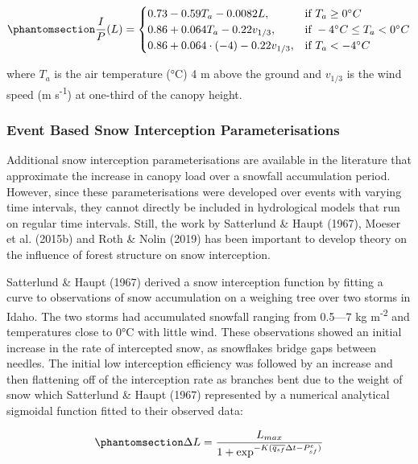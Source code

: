\documentclass[
  letterpaper,
]{tex/uofsthesis-cs}
\begin{document}
\begin{equation}\phantomsection\label{eq-kat-ip}{
\frac{I}{P}(L) = \begin{cases}
    0.73-0.59T_a-0.0082L,& \text{if } T_a\geq 0 ^{\circ} C \\
    0.86+0.064T_a-0.22v_{1/3},              & \text{if } -4 ^{\circ} C \leq T_a <0 ^{\circ} C \\
        0.86+0.064\cdot(-4)-0.22v_{1/3},              & \text{if } T_a < -4 ^{\circ} C
\end{cases}
}\end{equation}

where \(T_a\) is the air temperature (°C) 4 m above the ground and
\(v_{1/3}\) is the wind speed (m s\textsuperscript{-1}) at one-third of
the canopy height.

\subsubsection{Event Based Snow Interception
Parameterisations}\label{event-based-snow-interception-parameterisations}

Additional snow interception parameterisations are available in the
literature that approximate the increase in canopy load over a snowfall
accumulation period. However, since these parameterisations were
developed over events with varying time intervals, they cannot directly
be included in hydrological models that run on regular time intervals.
Still, the work by Satterlund \& Haupt (1967), Moeser et al. (2015b) and
Roth \& Nolin (2019) has been important to develop theory on the
influence of forest structure on snow interception.

Satterlund \& Haupt (1967) derived a snow interception function by
fitting a curve to observations of snow accumulation on a weighing tree
over two storms in Idaho. The two storms had accumulated snowfall
ranging from 0.5---7 kg m\textsuperscript{-2} and temperatures close to
0°C with little wind. These observations showed an initial increase in
the rate of intercepted snow, as snowflakes bridge gaps between needles.
The initial low interception efficiency was followed by an increase and
then flattening off of the interception rate as branches bent due to the
weight of snow which Satterlund \& Haupt (1967) represented by a
numerical analytical sigmoidal function fitted to their observed data:

\begin{equation}\phantomsection\label{eq-satterlund}{
\Delta L = \frac{L_{max}}{1+\text{exp}^{-K(\overline{q_{sf}} \Delta t-P_{sf}^e)}}
}\end{equation}
\end{document}
